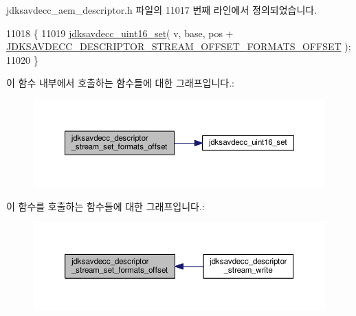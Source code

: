 jdksavdecc\+\_\+aem\+\_\+descriptor.\+h 파일의 11017 번째 라인에서 정의되었습니다.


\begin{DoxyCode}
11018 \{
11019     \hyperlink{group__endian_ga14b9eeadc05f94334096c127c955a60b}{jdksavdecc\_uint16\_set}( v, base, pos + 
      \hyperlink{group__descriptor__stream_gaa903203acf8683af611fdff61a45d61d}{JDKSAVDECC\_DESCRIPTOR\_STREAM\_OFFSET\_FORMATS\_OFFSET} );
11020 \}
\end{DoxyCode}


이 함수 내부에서 호출하는 함수들에 대한 그래프입니다.\+:
\nopagebreak
\begin{figure}[H]
\begin{center}
\leavevmode
\includegraphics[width=350pt]{group__descriptor__stream_gaaaa49480b22af710f7ac55f2f6606498_cgraph}
\end{center}
\end{figure}




이 함수를 호출하는 함수들에 대한 그래프입니다.\+:
\nopagebreak
\begin{figure}[H]
\begin{center}
\leavevmode
\includegraphics[width=350pt]{group__descriptor__stream_gaaaa49480b22af710f7ac55f2f6606498_icgraph}
\end{center}
\end{figure}


